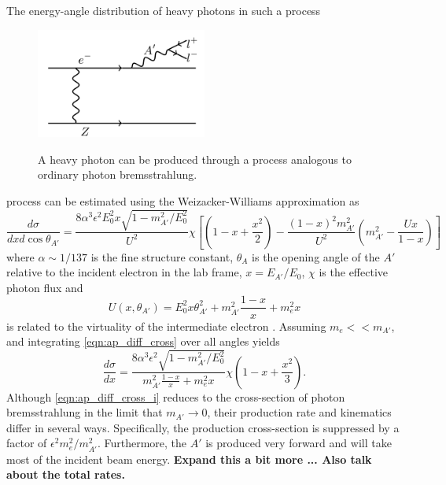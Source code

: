 The energy-angle distribution of heavy photons in such a process 
\begin{figure}[t]
    \centering
    \caption{A heavy photon can be produced through a process analogous to 
             ordinary photon bremsstrahlung.}
    \includegraphics[width=0.5\textwidth]{images/aprime_brem.png}
    \label{fig:ap_production}
\end{figure}  
process can be estimated using the Weizacker-Williams approximation as 
\begin{equation}
    \label{eqn:ap_diff_cross}
    \frac{d\sigma}{dx d\cos\theta_{A'}} =
    \frac{8 \alpha^{3} \epsilon^{2} E_{0}^2 x \sqrt{1-m_{A'}^{2}/E_{0}^{2}}}{U^{2}} \chi
    \left [ \left (1 - x + \frac{x^{2}}{2} \right ) 
    - \frac{(1-x)^{2} m_{A'}^{2}}{U^{2}}
    \left(m_{A'}^{2} - \frac{Ux}{1-x} \right) \right]
\end{equation}
where $\alpha \sim 1/137$ is the fine structure constant, $\theta_{A}$ is the
opening angle of the $A'$ relative to the incident electron in the lab frame, 
$x = E_{A'}/E_{0}$, $\chi$ is the effective photon flux and 
\begin{equation}
    U(x, \theta_{A'}) = E_{0}^{2}x\theta_{A'}^{2} 
    + m_{A'}^{2}\frac{1-x}{x} + m_{e}^2 x
\end{equation}
is related to the virtuality of the intermediate electron 
\cite{PhysRevD.80.075018, PhysRevD.34.1326}.  Assuming $m_{e} << m_{A'}$, 
and integrating \ref{eqn:ap_diff_cross} over all angles yields
\begin{equation}
    \label{eqn:ap_diff_cross_i}
    \frac{d\sigma}{dx} = \frac{8\alpha^{3}\epsilon^{2} \sqrt{1-m_{A'}^{2}/E_{0}^{2}}}
    {m_{A'}^{2}\frac{1-x}{x} + m_{e}^{2}x}\chi
    \left( 1 - x + \frac{x^{2}}{3}\right).
\end{equation}
Although \ref{eqn:ap_diff_cross_i} reduces to the cross-section of photon 
bremsstrahlung in the limit that $m_{A'} \rightarrow 0$, their production rate
and kinematics differ in several ways. Specifically, the production 
cross-section is suppressed by a factor of $\epsilon^{2}m_{e}^{2}/m_{A'}^{2}$.
Furthermore, the $A'$ is produced very forward and will take most of the 
incident beam energy. \textbf{Expand this a bit more ... Also talk about the
total rates.}

